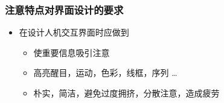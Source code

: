 \documentclass{beamer}
\begin{document}
{
\frame[plain]{\transdissolve}
}

\begin{frame}
	\frametitle{注意特点对界面设计的要求}
	\beamertemplatetransparentcovereddynamicmedium
	\begin{itemize}
		\item 在设计人机交互界面时应做到
		\begin{itemize}[<+->]
			\item 使重要信息吸引注意
			\item 高亮醒目，运动，色彩，线框，序列 \dots
			\item 朴实，简洁，避免过度拥挤，分散注意，造成疲劳
		\end{itemize}
	\end{itemize}
\end{frame}
\end{document}
